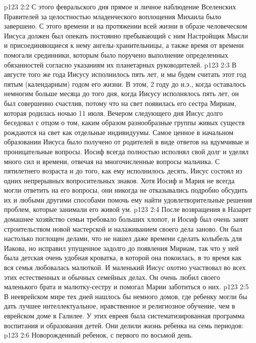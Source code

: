 \vs p123 2:2 С этого февральского дня прямое и личное наблюдение Вселенских Правителей за целостностью младенческого воплощения Михаила было завершено. С этого времени и на протяжении всей жизни в образе человеческом Иисуса должен был опекать постоянно пребывающий с ним Настройщик Мысли и присоединяющиеся к нему ангелы\hyp{}хранительницы, а также время от времени помогали срединники, которым было поручено выполнение определенных обязанностей согласно указаниям их планетарных руководителей.
\vs p123 2:3 \pc В августе того же года Иисусу исполнилось пять лет, и мы будем считать этот год пятым (календарным) годом его жизни. В этом, 2 году до н.э., когда оставалось немногим больше месяца до того дня, когда Иисусу исполнялось пять лет, он был совершенно счастлив, потому что на свет появилась его сестра Мириам, которая родилась ночью 11 июля. Вечером следующего дня Иисус долго беседовал с отцом о том, каким образом разнообразные группы живых существ рождаются на свет как отдельные индивидуумы. Самое ценное в начальном образовании Иисуса было получено от родителей в виде ответов на вдумчивые и проницательные вопросы. Иосиф всегда полностью исполнял свой долг и уделял много сил и времени, отвечая на многочисленные вопросы мальчика. С пятилетнего возраста и до того, как ему исполнилось десять, Иисус состоял из одних непрерывных вопросительных знаков. Хотя Иосиф и Мария не всегда могли ответить на его вопросы, они никогда не отказывались подробно обсудить их и любыми другими способами помочь ему найти удовлетворительные решения проблем, которые занимали его живой ум.
\vs p123 2:4 После возвращения в Назарет домашнее хозяйство семьи требовало больших хлопот, и Иосиф был очень занят строительством новой мастерской и налаживанием своего дела заново. Он был настолько поглощен делами, что не нашел даже времени сделать колыбель для Иакова, но исправил упущенное задолго до появления Мириам, так что у ней была детская очень удобная кроватка, в которой она покоилась, в то время как вся семья любовалась малюткой. И маленький Иисус охотно участвовал во всех этих естественных и обычных семейных делах. Он очень любил своего маленького брата и малютку\hyp{}сестру и помогал Марии заботиться о них.
\vs p123 2:5 В нееврейском мире тех дней нашлось бы немного домов, где ребенку могли бы дать лучшее интеллектуальное, нравственное и религиозное обучение, чем в еврейском доме в Галилее. У этих евреев была систематизированная программа воспитания и образования детей. Они делили жизнь ребенка на семь периодов:
\vs p123 2:6 \bibnobreakspace Новорожденный ребенок, с первого по восьмой день.
